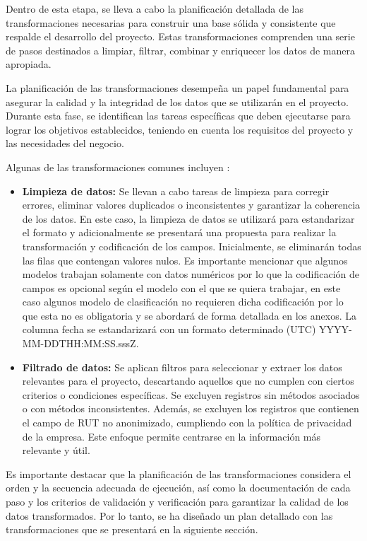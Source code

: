 Dentro de esta etapa, se lleva a cabo la planificación detallada de las transformaciones necesarias para construir una base sólida y consistente que respalde el desarrollo del proyecto. Estas transformaciones comprenden una serie de pasos destinados a limpiar, filtrar, combinar y enriquecer los datos de manera apropiada.

La planificación de las transformaciones desempeña un papel fundamental para asegurar la calidad y la integridad de los datos que se utilizarán en el proyecto. Durante esta fase, se identifican las tareas específicas que deben ejecutarse para lograr los objetivos establecidos, teniendo en cuenta los requisitos del proyecto y las necesidades del negocio.

Algunas de las transformaciones comunes incluyen \cite{etl-toolkit}:

\begin{itemize}
    \item \textbf{Limpieza de datos:} Se llevan a cabo tareas de limpieza para corregir errores, eliminar valores duplicados o inconsistentes y garantizar la coherencia de los datos. En este caso, la limpieza de datos se utilizará para estandarizar el formato y adicionalmente se presentará una propuesta para realizar la transformación y codificación de los campos. Inicialmente, se eliminarán todas las filas que contengan valores nulos. Es importante mencionar que algunos modelos trabajan solamente con datos numéricos por lo que la codificación de campos es opcional según el modelo con el que se quiera trabajar, en este caso algunos modelo de clasificación no requieren dicha codificación por lo que esta no es obligatoria y se abordará de forma detallada en los anexos. %
    La columna fecha se estandarizará con un formato determinado (UTC) YYYY-MM-DDTHH:MM:SS.sssZ.

    \item \textbf{Filtrado de datos:} Se aplican filtros para seleccionar y extraer los datos relevantes para el proyecto, descartando aquellos que no cumplen con ciertos criterios o condiciones específicas. Se excluyen registros sin métodos asociados o con métodos inconsistentes. Además, se excluyen los registros que contienen el campo de RUT no anonimizado, cumpliendo con la política de privacidad de la empresa. Este enfoque permite centrarse en la información más relevante y útil.
\end{itemize}

Es importante destacar que la planificación de las transformaciones considera el orden y la secuencia adecuada de ejecución, así como la documentación de cada paso y los criterios de validación y verificación para garantizar la calidad de los datos transformados. Por lo tanto, se ha diseñado un plan detallado con las transformaciones que se presentará en la siguiente sección.